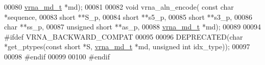 \begin{DoxyCode}
00080                             \hyperlink{group__model__details_structvrna__md__s}{vrna\_md\_t} *md);
00081 
00082 \textcolor{keywordtype}{void} vrna\_aln\_encode( \textcolor{keyword}{const} \textcolor{keywordtype}{char} *sequence,
00083                       \textcolor{keywordtype}{short} **S\_p,
00084                       \textcolor{keywordtype}{short} **s5\_p,
00085                       \textcolor{keywordtype}{short} **s3\_p,
00086                       \textcolor{keywordtype}{char} **ss\_p,
00087                       \textcolor{keywordtype}{unsigned} \textcolor{keywordtype}{short} **as\_p,
00088                       \hyperlink{group__model__details_structvrna__md__s}{vrna\_md\_t} *md);
00089 
00094 \textcolor{preprocessor}{#ifdef  VRNA\_BACKWARD\_COMPAT}
00095 
00096 DEPRECATED(\textcolor{keywordtype}{char}  *get\_ptypes(\textcolor{keyword}{const} \textcolor{keywordtype}{short} *S, \hyperlink{group__model__details_structvrna__md__s}{vrna\_md\_t} *md, \textcolor{keywordtype}{unsigned} \textcolor{keywordtype}{int} idx\_type));
00097 
00098 \textcolor{preprocessor}{#endif}
00099 
00100 \textcolor{preprocessor}{#endif}
\end{DoxyCode}
